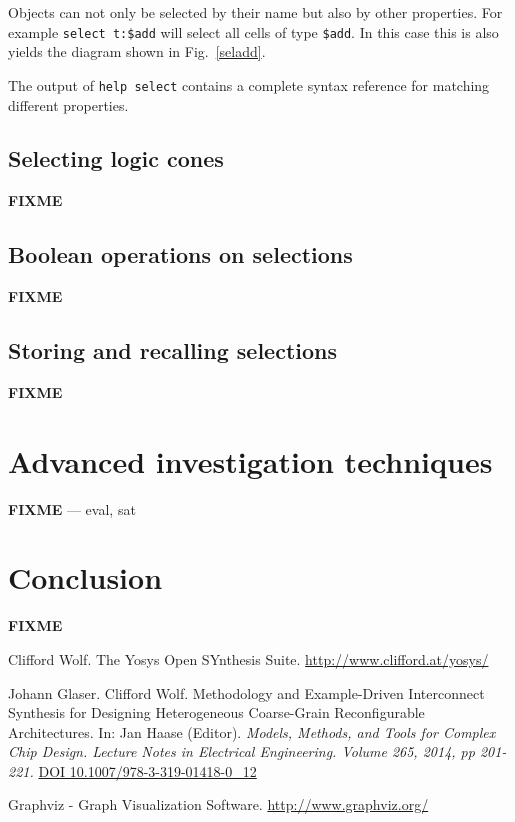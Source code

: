 \documentclass[9pt,technote,a4paper]{IEEEtran}
\def\FIXME{{\color{red}\bf FIXME}}
\begin{document}
Objects can not only be selected by their name but also by other properties.
For example {\tt select t:\$add} will select all cells of type {\tt \$add}. In
this case this is also yields the diagram shown in Fig.~\ref{seladd}.

The output of {\tt help select} contains a complete syntax reference for
matching different properties.

\subsection{Selecting logic cones}

\FIXME{}

\subsection{Boolean operations on selections}

\FIXME{}

\subsection{Storing and recalling selections}

\FIXME{}

\section{Advanced investigation techniques}
\label{poke}

\FIXME{} --- eval, sat

\section{Conclusion}
\label{conclusion}

\FIXME

\begin{thebibliography}{9}

Clifford Wolf. The Yosys Open SYnthesis Suite.
\url{http://www.clifford.at/yosys/}

Johann Glaser. Clifford Wolf. Methodology and Example-Driven Interconnect
Synthesis for Designing Heterogeneous Coarse-Grain Reconfigurable
Architectures. In: Jan Haase (Editor). {\it Models, Methods, and Tools for Complex Chip Design.
Lecture Notes in Electrical Engineering. Volume 265, 2014, pp 201-221.\/}
\href{http://dx.doi.org/10.1007/978-3-319-01418-0_12}{DOI 10.1007/978-3-319-01418-0\_12}

Graphviz - Graph Visualization Software.
\url{http://www.graphviz.org/}

\end{thebibliography}
\end{document}
